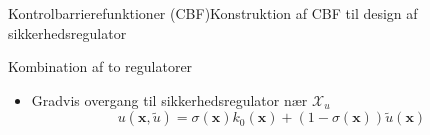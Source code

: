 \begin{frame}{Kontrolbarrierefunktioner (CBF)}{Konstruktion af CBF til design af sikkerhedsregulator}
\begin{block}{Kombination af to regulatorer}
\begin{itemize}
		\item Gradvis overgang til sikkerhedsregulator nær $\mathcal{X}_u$
		\vspace{-1mm}
		\begin{equation*}
		u(\mathbf{x},\tilde{u})=\sigma(\mathbf{x})k_0(\mathbf{x})+(1-\sigma(\mathbf{x}))\tilde{u}(\mathbf{x})
		\end{equation*}
	\end{itemize}
\end{block}


	\vspace{5mm}
\end{frame}